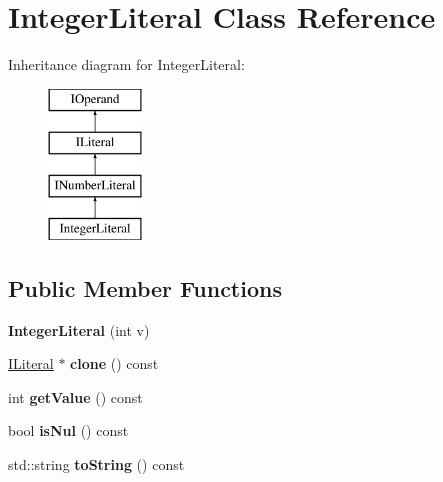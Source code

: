 \hypertarget{class_integer_literal}{}\section{Integer\+Literal Class Reference}
\label{class_integer_literal}
Inheritance diagram for Integer\+Literal\+:\begin{figure}[H]
\begin{center}
\leavevmode
\includegraphics[height=4.000000cm]{class_integer_literal}
\end{center}
\end{figure}
\subsection*{Public Member Functions}
\begin{DoxyCompactItemize}
\item 
{\bfseries Integer\+Literal} (int v)\hypertarget{class_integer_literal_acf5b594d1359f1a46535d5631b0d1bb7}{}\label{class_integer_literal_acf5b594d1359f1a46535d5631b0d1bb7}

\item 
\hyperlink{class_i_literal}{I\+Literal} $\ast$ {\bfseries clone} () const \hypertarget{class_integer_literal_a787e39902804df344d3ab6f84d789614}{}\label{class_integer_literal_a787e39902804df344d3ab6f84d789614}

\item 
int {\bfseries get\+Value} () const \hypertarget{class_integer_literal_a1311d1430ddbb363ba982db0f2cb3d3f}{}\label{class_integer_literal_a1311d1430ddbb363ba982db0f2cb3d3f}

\item 
bool {\bfseries is\+Nul} () const \hypertarget{class_integer_literal_a41eaa798488ccc7d61062b7e9ed41ffd}{}\label{class_integer_literal_a41eaa798488ccc7d61062b7e9ed41ffd}

\item 
std\+::string {\bfseries to\+String} () const \hypertarget{class_integer_literal_a4610ccbaadb6ce500aaa546cee810f99}{}\label{class_integer_literal_a4610ccbaadb6ce500aaa546cee810f99}

\end{DoxyCompactItemize}
